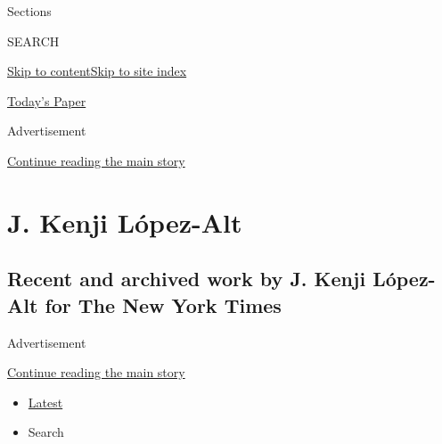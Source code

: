Sections

SEARCH

\protect\hyperlink{site-content}{Skip to
content}\protect\hyperlink{site-index}{Skip to site index}

\href{https://myaccount.nytimes3xbfgragh.onion/auth/login?response_type=cookie\&client_id=vi}{}

\href{https://www.nytimes3xbfgragh.onion/section/todayspaper}{Today's
Paper}

Advertisement

\protect\hyperlink{after-top}{Continue reading the main story}

\hypertarget{j-kenji-luxf3pez-alt}{%
\section{J. Kenji López-Alt}\label{j-kenji-luxf3pez-alt}}

\hypertarget{recent-and-archived-work-by-j-kenji-luxf3pez-alt-for-the-new-york-times}{%
\subsection{Recent and archived work by J. Kenji López-Alt for The New
York
Times}\label{recent-and-archived-work-by-j-kenji-luxf3pez-alt-for-the-new-york-times}}

Advertisement

\protect\hyperlink{after-mid1}{Continue reading the main story}

\begin{itemize}
\tightlist
\item
  \protect\hyperlink{stream-panel}{Latest}
\item
  Search
\end{itemize}

